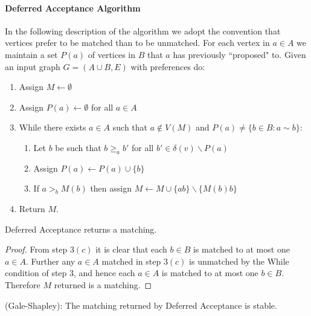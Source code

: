 \paragraph{Deferred Acceptance Algorithm}
In the following description of the algorithm we adopt the convention that vertices prefer to be matched than to be unmatched. For each vertex in $a\in A$ we maintain a set $P(a)$ of vertices in $B$ that $a$ has previously ``proposed" to. Given an input graph $G=(A \cup B, E)$ with preferences do:
\begin{enumerate}
\item Assign $M \leftarrow \emptyset$
\item Assign $P(a) \leftarrow \emptyset$ for all $a \in A$
\item While there exists $a \in A$ such that $a \not\in V(M)$ and $P(a) \neq \{b \in B : a\sim b\}$:
	\begin{enumerate}
	\item Let $b$ be such that $b \geq_a b'$ for all $b' \in \delta(v) \backslash P(a)$
	\item Assign $P(a) \leftarrow P(a) \cup \{b\}$
	\item If $a >_b M(b)$ then assign $M \leftarrow M \cup \{ab\} \backslash \{M(b)b\}$
	\end{enumerate}
\item Return $M$.
\end{enumerate}
\begin{lemma} Deferred Acceptance returns a matching.
\end{lemma}
\begin{proof}
From step $3(c)$ it is clear that each $b \in B$ is matched to at most one $a \in A$. Further any $a \in A$ matched in step $3(c)$ is unmatched by the While condition of step $3$, and hence each $a \in A$ is matched to at most one $b \in B$. Therefore $M$ returned is a matching. \end{proof}
\begin{theorem}(Gale-Shapley): The matching returned by Deferred Acceptance is stable.
\end{theorem}
